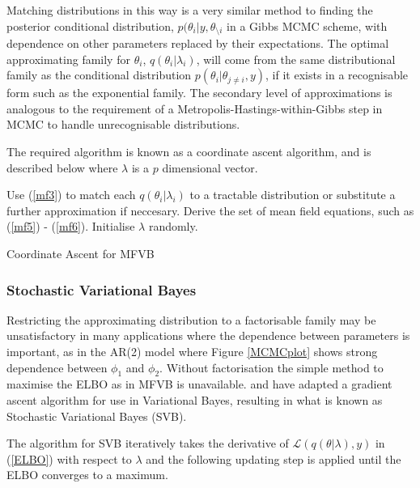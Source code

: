 \documentclass[12pt,a4paper]{article}%
\numberwithin{equation}{section}
\begin{document}
Matching distributions in this way is a very similar method to finding the posterior conditional distribution, $p(\theta_i | y, \theta_{\setminus i}$ in a Gibbs MCMC scheme, with dependence on other parameters replaced by their expectations. The optimal approximating family for $\theta_i$, $q(\theta_i | \lambda_i)$, will come from the same distributional family as the conditional distribution $p(\theta_i | \theta_{j \neq i}, y)$, if it exists in a recognisable form such as the exponential family. The secondary level of approximations is analogous to the requirement of a Metropolis-Hastings-within-Gibbs step in MCMC to handle unrecognisable distributions.
\vspace{5mm}

The required algorithm is known as a coordinate ascent algorithm, and is described below where $\lambda$ is a $p$ dimensional vector.

\vspace{2mm}

\begin{algorithm}[H]
 Use (\ref{mf3}) to match each $q(\theta_i|\lambda_i)$ to a tractable distribution or substitute a further approximation if neccesary.\;
 Derive the set of mean field equations, such as (\ref{mf5}) - (\ref{mf6}).\;
 Initialise $\lambda$ randomly. \;
 \caption{Coordinate Ascent for MFVB}
  \label{alg:algorithm1}
\end{algorithm}

\subsubsection{Stochastic Variational Bayes}

Restricting the approximating distribution to a factorisable family may be unsatisfactory in many applications where the dependence between parameters is important, as in the AR(2) model where Figure \ref{MCMCplot} shows strong dependence between $\phi_1$ and $\phi_2$. Without factorisation the simple method to maximise the ELBO as in MFVB is unavailable. \citet{Paisley2012} and \citet{Ranganath2014} have adapted a gradient ascent algorithm for use in Variational Bayes, resulting in what is known as Stochastic Variational Bayes (SVB).

The algorithm for SVB iteratively takes the  derivative of $\mathcal{L}(q(\theta | \lambda), y)$ in (\ref{ELBO}) with respect to $\lambda$ and the following updating step is applied until the ELBO converges to a maximum.
\end{document}
